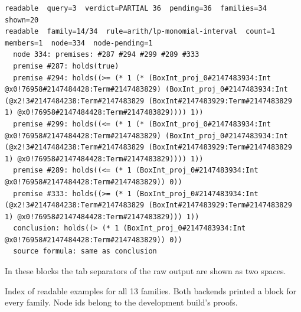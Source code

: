 \documentclass[10pt,a4paper]{article}
\begin{document}
\begin{lstlisting}[basicstyle=\ttfamily\footnotesize,breaklines=true,breakatwhitespace=false,columns=fullflexible,keepspaces=true,showstringspaces=false,breakindent=1.5em,postbreak=\mbox{\textcolor{gray}{$\hookrightarrow$}\space},frame=single,rulecolor=\color{lightgray},xleftmargin=2pt,xrightmargin=2pt,aboveskip=6pt,belowskip=6pt]
readable  query=3  verdict=PARTIAL 36  pending=36  families=34  shown=20
readable  family=14/34  rule=arith/lp-monomial-interval  count=1  members=1  node=334  node-pending=1
  node 334: premises: #287 #294 #299 #289 #333
  premise #287: holds(true)
  premise #294: holds((>= (* 1 (* (BoxInt_proj_0#2147483934:Int @x0!76958#2147484428:Term#2147483829) (BoxInt_proj_0#2147483934:Int (@x2!3#2147484238:Term#2147483829 (BoxInt#2147483929:Term#2147483829 1) @x0!76958#2147484428:Term#2147483829)))) 1))
  premise #299: holds((<= (* 1 (* (BoxInt_proj_0#2147483934:Int @x0!76958#2147484428:Term#2147483829) (BoxInt_proj_0#2147483934:Int (@x2!3#2147484238:Term#2147483829 (BoxInt#2147483929:Term#2147483829 1) @x0!76958#2147484428:Term#2147483829)))) 1))
  premise #289: holds((<= (* 1 (BoxInt_proj_0#2147483934:Int @x0!76958#2147484428:Term#2147483829)) 0))
  premise #333: holds((>= (* 1 (BoxInt_proj_0#2147483934:Int (@x2!3#2147484238:Term#2147483829 (BoxInt#2147483929:Term#2147483829 1) @x0!76958#2147484428:Term#2147483829))) 1))
  conclusion: holds((> (* 1 (BoxInt_proj_0#2147483934:Int @x0!76958#2147484428:Term#2147483829)) 0))
  source formula: same as conclusion
\end{lstlisting}

In these blocks the tab separators of the raw output are shown as two spaces.

Index of readable examples for all 13 families. Both backends printed a block for every family. Node ids belong to the development build's proofs.
\end{document}
